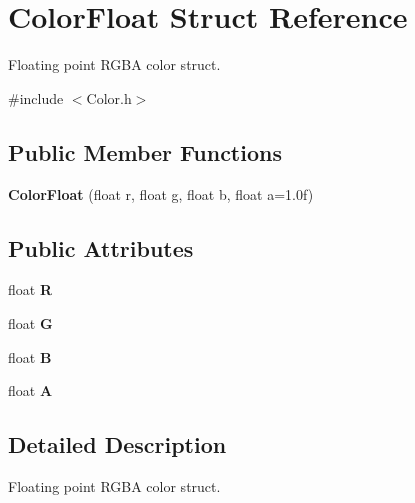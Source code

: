 \hypertarget{struct_color_float}{\section{Color\+Float Struct Reference}
\label{struct_color_float}
}


Floating point R\+G\+B\+A color struct.  




{\ttfamily \#include $<$Color.\+h$>$}

\subsection*{Public Member Functions}
\begin{DoxyCompactItemize}
\item 
\hypertarget{struct_color_float_a035529117ce865b9208aa429f9a97444}{{\bfseries Color\+Float} (float r, float g, float b, float a=1.\+0f)}\label{struct_color_float_a035529117ce865b9208aa429f9a97444}

\end{DoxyCompactItemize}
\subsection*{Public Attributes}
\begin{DoxyCompactItemize}
\item 
\hypertarget{struct_color_float_a03a281944228fa7de5251633c0c270c7}{float {\bfseries R}}\label{struct_color_float_a03a281944228fa7de5251633c0c270c7}

\item 
\hypertarget{struct_color_float_a6c8d0d5307f56ab8d298cfb4246b5c08}{float {\bfseries G}}\label{struct_color_float_a6c8d0d5307f56ab8d298cfb4246b5c08}

\item 
\hypertarget{struct_color_float_a12bb7d32004e66d2063093bccd87dd72}{float {\bfseries B}}\label{struct_color_float_a12bb7d32004e66d2063093bccd87dd72}

\item 
\hypertarget{struct_color_float_a518c16e83cea9c578964377499015b20}{float {\bfseries A}}\label{struct_color_float_a518c16e83cea9c578964377499015b20}

\end{DoxyCompactItemize}


\subsection{Detailed Description}
Floating point R\+G\+B\+A color struct. 

